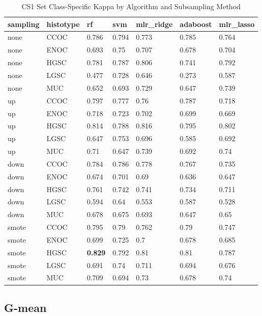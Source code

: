 \documentclass[
]{report}
\begin{document}
\begin{table}

\caption{\label{tab:cs1-kappa-class-table}CS1 Set Class-Specific Kappa by Algorithm and Subsampling Method}
\centering
\begin{tabular}[t]{l|l|l|l|l|l|l}
\hline
sampling & histotype & rf & svm & mlr\_ridge & adaboost & mlr\_lasso\\
\hline
none & CCOC & 0.786 & 0.794 & 0.773 & 0.785 & 0.764\\
\hline
none & ENOC & 0.693 & 0.75 & 0.707 & 0.678 & 0.704\\
\hline
none & HGSC & 0.781 & 0.787 & 0.806 & 0.741 & 0.792\\
\hline
none & LGSC & 0.477 & 0.728 & 0.646 & 0.273 & 0.587\\
\hline
none & MUC & 0.652 & 0.693 & 0.729 & 0.647 & 0.739\\
\hline
up & CCOC & 0.797 & 0.777 & 0.76 & 0.787 & 0.718\\
\hline
up & ENOC & 0.718 & 0.723 & 0.702 & 0.699 & 0.669\\
\hline
up & HGSC & 0.814 & 0.788 & 0.816 & 0.795 & 0.802\\
\hline
up & LGSC & 0.647 & 0.753 & 0.696 & 0.585 & 0.692\\
\hline
up & MUC & 0.71 & 0.647 & 0.739 & 0.692 & 0.74\\
\hline
down & CCOC & 0.784 & 0.786 & 0.778 & 0.767 & 0.735\\
\hline
down & ENOC & 0.674 & 0.701 & 0.69 & 0.636 & 0.647\\
\hline
down & HGSC & 0.761 & 0.742 & 0.741 & 0.734 & 0.711\\
\hline
down & LGSC & 0.594 & 0.64 & 0.553 & 0.587 & 0.528\\
\hline
down & MUC & 0.678 & 0.675 & 0.693 & 0.647 & 0.65\\
\hline
smote & CCOC & 0.795 & 0.79 & 0.762 & 0.79 & 0.747\\
\hline
smote & ENOC & 0.699 & 0.725 & 0.7 & 0.678 & 0.685\\
\hline
smote & HGSC & \textbf{0.829} & 0.792 & 0.81 & 0.81 & 0.787\\
\hline
smote & LGSC & 0.691 & 0.74 & 0.711 & 0.694 & 0.676\\
\hline
smote & MUC & 0.709 & 0.694 & 0.73 & 0.678 & 0.74\\
\hline
\end{tabular}
\end{table}

\hypertarget{g-mean-2}{%
\subsection{G-mean}\label{g-mean-2}}
\end{document}
